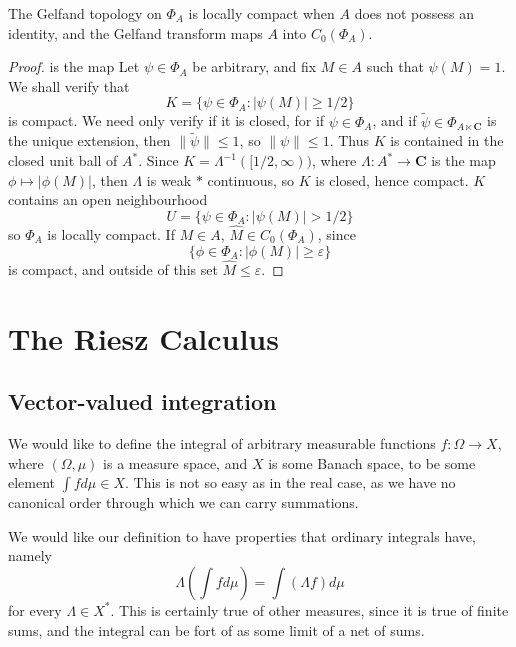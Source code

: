 \begin{theorem}
    The Gelfand topology on $\Phi_A$ is locally compact when $A$ does not possess an identity, and the Gelfand transform maps $A$ into $C_0(\Phi_A)$.
\end{theorem}
\begin{proof}is the map
    Let $\psi \in \Phi_A$ be arbitrary, and fix $M \in A$ such that $\psi(M) = 1$. We shall verify that
    \[ K = \{ \psi \in \Phi_A : |\psi(M)| \geq 1/2 \} \]
    is compact. We need only verify if it is closed, for if $\psi \in \Phi_A$, and if $\tilde{\psi} \in \Phi_{A \ltimes \mathbf{C}}$ is the unique extension, then $\| \tilde{\psi} \| \leq 1$, so $\| \psi \| \leq 1$. Thus $K$ is contained in the closed unit ball of $A^*$. Since $K = \Lambda^{-1}([1/2, \infty))$, where $\Lambda: A^* \to \mathbf{C}$ is the map $\phi \mapsto |\phi(M)|$, then $\Lambda$ is weak $*$ continuous, so $K$ is closed, hence compact. $K$ contains an open neighbourhood
    \[ U = \{ \psi \in \Phi_A : |\psi(M)| > 1/2 \} \]
    so $\Phi_A$ is locally compact. If $M \in A$, $\widehat{M} \in C_0(\Phi_A)$, since
    \[ \{ \phi \in \Phi_A : |\phi(M)| \geq \varepsilon \} \]
    is compact, and outside of this set $\widehat{M} \leq \varepsilon$.
\end{proof}



\section{The Riesz Calculus}

\subsection{Vector-valued integration}

We would like to define the integral of arbitrary measurable functions $f: \Omega \to X$, where $(\Omega, \mu)$ is a measure space, and $X$ is some Banach space, to be some element $\int f d\mu \in X$. This is not so easy as in the real case, as we have no canonical order through which we can carry summations.

We would like our definition to have properties that ordinary integrals have, namely
%
\[ \Lambda \left( \int f d\mu \right) = \int (\Lambda f) d\mu \]
%
for every $\Lambda \in X^*$. This is certainly true of other measures, since it is true of finite sums, and the integral can be fort of as some limit of a net of sums.

